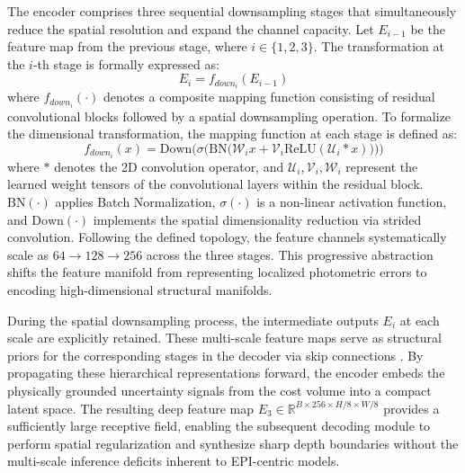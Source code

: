 \documentclass[lettersize,journal]{IEEEtran}
\begin{document}
The encoder comprises three sequential downsampling stages that simultaneously reduce the spatial resolution and expand the channel capacity. Let $E_{i-1}$ be the feature map from the previous stage, where $i \in \{1, 2, 3\}$. The transformation at the $i$-th stage is formally expressed as:
\begin{equation}
E_i = f_{down_i}(E_{i-1})
\end{equation}
where $f_{down_i}(\cdot)$ denotes a composite mapping function consisting of residual convolutional blocks \cite{he2016} followed by a spatial downsampling operation. To formalize the dimensional transformation, the mapping function at each stage is defined as:
\begin{equation}
f_{down_i}(x) = \text{Down}\Big( \sigma \big( \text{BN} \big( \mathcal{W}_i  x + \mathcal{V}_i  \text{ReLU}(\mathcal{U}_i * x) \big) \big) \Big)
\end{equation}
where $*$ denotes the 2D convolution operator, and $\mathcal{U}_i, \mathcal{V}_i, \mathcal{W}_i$ represent the learned weight tensors of the convolutional layers within the residual block. $\text{BN}(\cdot)$ applies Batch Normalization, $\sigma(\cdot)$ is a non-linear activation function, and $\text{Down}(\cdot)$ implements the spatial dimensionality reduction via strided convolution. Following the defined topology, the feature channels systematically scale as $64 \rightarrow 128 \rightarrow 256$ across the three stages. This progressive abstraction shifts the feature manifold from representing localized photometric errors to encoding high-dimensional structural manifolds.

During the spatial downsampling process, the intermediate outputs $E_i$ at each scale are explicitly retained. These multi-scale feature maps serve as structural priors for the corresponding stages in the decoder via skip connections \cite{lin2017}. By propagating these hierarchical representations forward, the encoder embeds the physically grounded uncertainty signals from the cost volume into a compact latent space. The resulting deep feature map $E_3 \in \mathbb{R}^{B \times 256 \times H/8 \times W/8}$ provides a sufficiently large receptive field, enabling the subsequent decoding module to perform spatial regularization and synthesize sharp depth boundaries without the multi-scale inference deficits inherent to EPI-centric models.

\subsection{}
\end{document}
